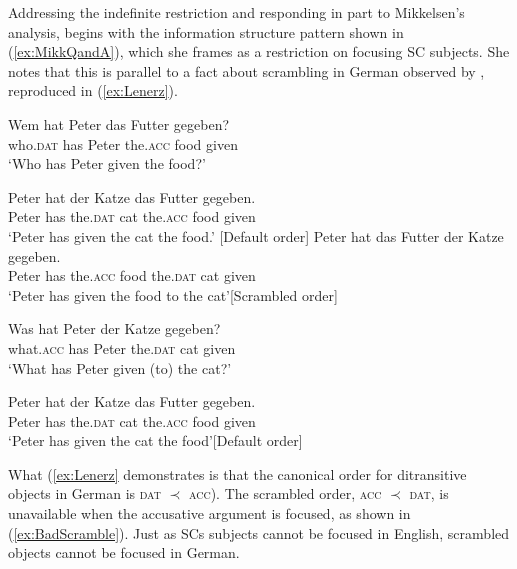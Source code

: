 \documentclass[
	letterpaper,
]{article}
\begin{document}
Addressing the indefinite restriction and responding in part to Mikkelsen's analysis, \textcite{heycock2012specification} begins with the information structure pattern shown in (\ref{ex:MikkQandA}), which she frames as a restriction on focusing SC subjects.
She notes that this is parallel to a fact about scrambling in German observed by \textcite{lenerz1977zur}, reproduced in (\ref{ex:Lenerz}).
\begin{exe}\label{ex:Lenerz} 
	\ex
	\begin{xlist}
		\ex \gll Wem hat Peter das Futter gegeben?\\
			who.\textsc{dat} has Peter the.\textsc{acc} food given\\
		\trans `Who has Peter given the food?'
		\begin{xlist}
			\ex \gll Peter hat der Katze das Futter gegeben.\\
				Peter has the.\textsc{dat} cat the.\textsc{acc} food given\\
			\trans `Peter has given the cat the food.' \hfill[Default order]
			\ex \gll Peter hat das Futter der Katze gegeben.\\
			Peter has the.\textsc{acc} food the.\textsc{dat} cat given\\
			\trans `Peter has given the food to the cat'\hfill[Scrambled order]	
		\end{xlist}
		\ex \gll Was hat Peter der Katze gegeben?\\
			what.\textsc{acc} has Peter the.\textsc{dat} cat given\\
		\trans `What has Peter given (to) the cat?'
		\begin{xlist}
			\ex \gll Peter hat der Katze das Futter gegeben.\\
			Peter has the.\textsc{dat} cat the.\textsc{acc} food given\\
			\trans `Peter has given the cat the food'\hfill[Default order]
			\label{ex:BadScramble} 

		\end{xlist}
	\end{xlist}
\end{exe}
What (\ref{ex:Lenerz} demonstrates is that the canonical order for ditransitive objects in German is \textsc{dat} $\prec$ \textsc{acc}).
The scrambled order, \textsc{acc} $\prec$ \textsc{dat}, is unavailable when the accusative argument is focused, as shown in (\ref{ex:BadScramble}). 
Just as SCs subjects cannot be focused in English, scrambled objects cannot be focused in German.
\end{document}
